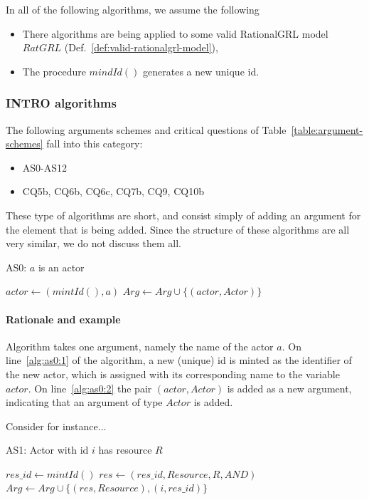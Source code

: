 In all of the following algorithms, we assume the following
\begin{itemize}
\item There algorithms are being applied to some valid RationalGRL model $RatGRL$ (Def.~\ref{def:valid-rationalgrl-model}),
\item The procedure $mindId()$ generates a new unique id.
\end{itemize}

\subsubsection{INTRO algorithms}

The following arguments schemes and critical questions of Table~\ref{table:argument-schemes} fall into this category:
\begin{itemize}
\item AS0-AS12
\item CQ5b, CQ6b, CQ6c, CQ7b, CQ9, CQ10b
\end{itemize}

These type of algorithms are short, and consist simply of adding an argument for the element that is being added. Since the structure of these algorithms are all very similar, we do not discuss them all. 

\begin{algorithm}[h]
  \caption{AS0: $a$ is an actor}\label{alg:add-actor}
  \begin{algorithmic}[1]
    \State $actor \leftarrow (mintId(), a)$ \label{alg:as0:1}
    \State $Arg\leftarrow Arg \cup \{(actor,Actor)\}$\label{alg:as0:2}
    \EndProcedure
  \end{algorithmic}
\end{algorithm}

\paragraph{Rationale and example} Algorithm takes one argument, namely the name of the actor $a$. On line~\ref{alg:as0:1} of the algorithm, a new (unique) id is minted as the identifier of the new actor, which is assigned with its corresponding name to the variable $actor$. On line~\ref{alg:as0:2} the pair $(actor,Actor)$ is added as a new argument, indicating that an argument of type $Actor$ is added.

Consider for instance...

\begin{algorithm}[h]
  \caption{AS1: Actor with id $i$ has resource $R$}\label{alg:add-actor}
  \begin{algorithmic}[1]
    \State $res\_id\gets mintId()$\label{alg:add-actor:id}
    \State $res\leftarrow (res\_id, Resource, R, AND)$\label{alg:add-actor:res}
    \State $Arg\gets Arg\cup \{(res, Resource),(i,res\_id)\}$\label{alg:add-actor:arg}
    \EndProcedure
  \end{algorithmic}
\end{algorithm}

